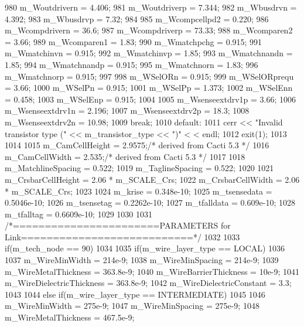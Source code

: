 \begin{DoxyCode}
{{{980                 m_Woutdrivern = 4.406;
981                 m_Woutdriverp = 7.344;
982                 m_Wbusdrvn = 4.392;
983                 m_Wbusdrvp = 7.32;
984 
985                 m_Wcompcellpd2 = 0.220;
986                 m_Wcompdrivern = 36.6;
987                 m_Wcompdriverp = 73.33;
988                 m_Wcomparen2 = 3.66;
989                 m_Wcomparen1 = 1.83;
990                 m_Wmatchpchg = 0.915;
991                 m_Wmatchinvn = 0.915;
992                 m_Wmatchinvp = 1.85;
993                 m_Wmatchnandn = 1.85;
994                 m_Wmatchnandp = 0.915;
995                 m_Wmatchnorn = 1.83;
996                 m_Wmatchnorp = 0.915;
997 
998                 m_WSelORn = 0.915;
999                 m_WSelORprequ = 3.66;
1000                 m_WSelPn = 0.915;
1001                 m_WSelPp = 1.373;
1002                 m_WSelEnn = 0.458;
1003                 m_WSelEnp = 0.915;
1004 
1005                 m_Wsenseextdrv1p = 3.66;
1006                 m_Wsenseextdrv1n = 2.196;
1007                 m_Wsenseextdrv2p = 18.3;
1008                 m_Wsenseextdrv2n = 10.98;
1009                 break;
1010             default:
1011                 cerr << "Invalid transistor type (" << m_transistor_type << ")" <
      < endl;
1012                 exit(1);
1013         }
1014 
1015         m_CamCellHeight = 2.9575;/* derived from Cacti 5.3 */ 
1016         m_CamCellWidth = 2.535;/* derived from Cacti 5.3 */
1017 
1018         m_MatchlineSpacing = 0.522;
1019         m_TaglineSpacing = 0.522;
1020 
1021         m_CrsbarCellHeight = 2.06 * m_SCALE_Crs;
1022         m_CrsbarCellWidth = 2.06 * m_SCALE_Crs;
1023 
1024         m_krise = 0.348e-10;
1025         m_tsensedata = 0.5046e-10;
1026         m_tsensetag = 0.2262e-10;
1027         m_tfalldata = 0.609e-10;
1028         m_tfalltag = 0.6609e-10;
1029     }
1030 
1031     /*=======================PARAMETERS for Link===========================*/
1032 
1033     if(m_tech_node == 90)
1034     {
1035         if(m_wire_layer_type == LOCAL)
1036         {
1037             m_WireMinWidth            = 214e-9;
1038             m_WireMinSpacing          = 214e-9;
1039             m_WireMetalThickness      = 363.8e-9;
1040             m_WireBarrierThickness    = 10e-9;
1041             m_WireDielectricThickness = 363.8e-9;
1042             m_WireDielectricConstant  = 3.3;
1043         }
1044         else if(m_wire_layer_type == INTERMEDIATE)
1045         {
1046             m_WireMinWidth            = 275e-9;
1047             m_WireMinSpacing          = 275e-9;
1048             m_WireMetalThickness      = 467.5e-9;
}}}
\end{DoxyCode}
